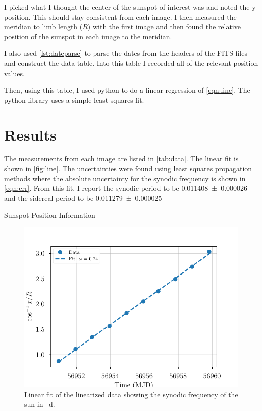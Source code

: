 \documentclass[%
aip,
jmp,
reprint,
floatfix,
]{revtex4-1}
\begin{document}
	I picked what I thought the center of the sunspot of interest was and noted the y-position. This should stay consistent from each image. I then measured the meridian to limb length ($R$) with the first image and then found the relative position of the sunspot in each image to the meridian. 
	
	I also used \autoref{lst:dateparse} to parse the dates from the headers of the FITS files and construct the data table. Into this table I recorded all of the relevant position values. 
	
	Then, using this table, I used python to do a linear regression of \autoref{eqn:line}. The python library uses a simple least-squares fit. 
	

	\section{Results}
	
	The measurements from each image are listed in \autoref{tab:data}. The linear fit is shown in \autoref{fig:line}. The uncertainties were found using least squares propagation methods where the absolute uncertainty for the synodic frequency is shown in \autoref{eqn:err}. From this fit, I report the synodic period to be \SI{.011408 \pm .000026}{\year} and the sidereal period to be \SI{.011279 \pm .000025}{\year}

	\begin{table}
		\centering
		\caption{Sunspot Position Information}
		\label{tab:data}
	\end{table}

	\begin{figure}[H]
		\centering
		\includegraphics[width=.9\linewidth]{figs/fit.pdf}
		\caption{Linear fit of the linearized data showing the synodic frequency of the sun in \si{\per\day}.}
		\label{fig:line}
	\end{figure}
\end{document}

